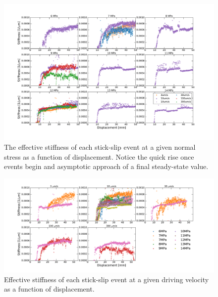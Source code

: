 \begin{figure}[H]
	\centering
		\includegraphics[scale=0.35]{chap_slow_slip_details/Figure_S3.pdf}
   	\caption{The effective stiffness of each stick-slip event at a given normal stress as a function of displacement. Notice the quick rise once events begin and asymptotic approach of a final steady-state value.}
  	\label{Figure_S3}
\end{figure}

\clearpage

\begin{figure}[H]
	\centering
		\includegraphics[scale=0.35]{chap_slow_slip_details/Figure_S4.pdf}
   	\caption{Effective stiffness of each stick-slip event at a given driving velocity as a function of displacement.}
  	\label{Figure_S4}
\end{figure}

\clearpage

